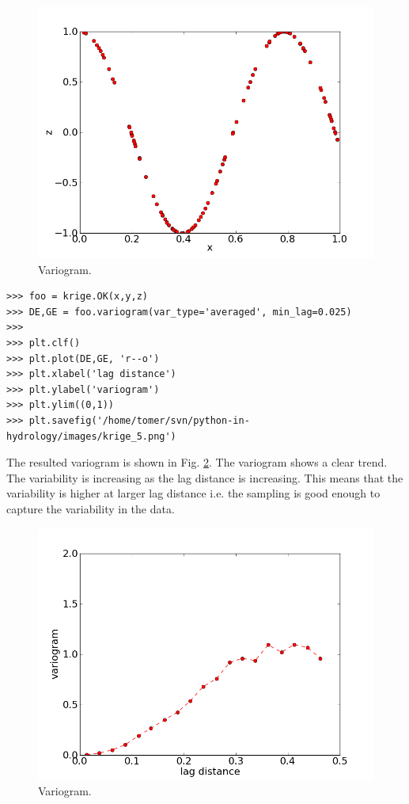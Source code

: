 \documentclass[10pt]{book}
\begin{document}
{\beforefig
\begin{figure}[h!]
  \centering
    \includegraphics[scale=0.5]{images/krige_4.png}
  \caption{Variogram.}
   \label{fig:krige_4}
\end{figure}
\afterfig


\beforeverb \begin{verbatim}
>>> foo = krige.OK(x,y,z)
>>> DE,GE = foo.variogram(var_type='averaged', min_lag=0.025)
>>> 
>>> plt.clf()
>>> plt.plot(DE,GE, 'r--o')
>>> plt.xlabel('lag distance')
>>> plt.ylabel('variogram')
>>> plt.ylim((0,1))
>>> plt.savefig('/home/tomer/svn/python-in-hydrology/images/krige_5.png')
\end{verbatim} \afterverb

The resulted variogram is shown in Fig. \ref{fig:krige_5}. The variogram shows a clear trend. The variability is increasing as the lag distance is increasing. This means that the variability is higher at larger lag distance i.e. the sampling is good enough to capture the variability in the data. 

\beforefig
\begin{figure}[h!]
  \centering
    \includegraphics[scale=0.5]{images/krige_5.png}
  \caption{Variogram.}
   \label{fig:krige_5}
\end{figure}
\afterfig

}
\end{document}
